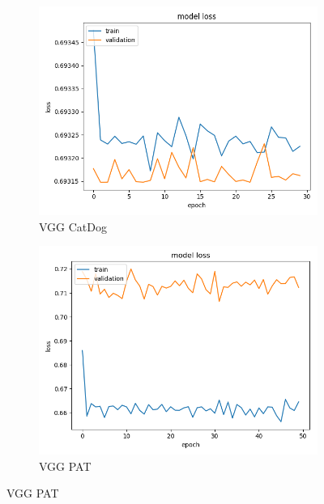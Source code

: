 \begin{figure}
\begin{subfigure}[b]{.45\linewidth}
\includegraphics[width=\linewidth]{Figs/vgg_catdog_loss.jpg}
\caption{VGG CatDog}
\end{subfigure}
\begin{subfigure}[b]{.45\linewidth}
\includegraphics[width=\linewidth]{Figs/vgg_pat_loss.jpg}
\caption{VGG PAT}
\end{subfigure}


\end{figure}
